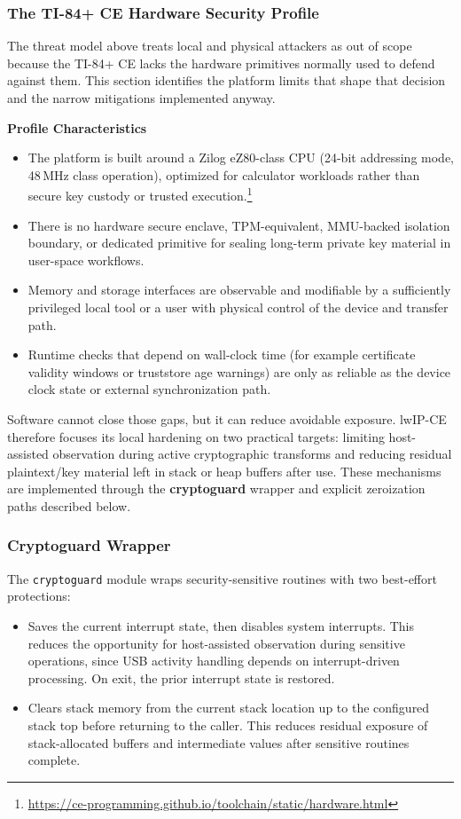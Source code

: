 \documentclass[titlepage]{report}
\begin{document}
	\subsubsection{The TI-84+ CE Hardware Security Profile}
	The threat model above treats local and physical attackers as out of scope because the TI-84+ CE lacks the hardware primitives normally used to defend against them. This section identifies the platform limits that shape that decision and the narrow mitigations implemented anyway.
	
	\textbf{Profile Characteristics}
	\begin{itemize}
		\item The platform is built around a Zilog eZ80-class CPU (24-bit addressing mode, 48\,MHz class operation), optimized for calculator workloads rather than secure key custody or trusted execution.\footnote{\url{https://ce-programming.github.io/toolchain/static/hardware.html}}
		\item There is no hardware secure enclave, TPM-equivalent, MMU-backed isolation boundary, or dedicated primitive for sealing long-term private key material in user-space workflows.
		\item Memory and storage interfaces are observable and modifiable by a sufficiently privileged local tool or a user with physical control of the device and transfer path.
		\item Runtime checks that depend on wall-clock time (for example certificate validity windows or truststore age warnings) are only as reliable as the device clock state or external synchronization path.
	\end{itemize}
	
	Software cannot close those gaps, but it can reduce avoidable exposure. lwIP-CE therefore focuses its local hardening on two practical targets: limiting host-assisted observation during active cryptographic transforms and reducing residual plaintext/key material left in stack or heap buffers after use. These mechanisms are implemented through the \textbf{cryptoguard} wrapper and explicit zeroization paths described below.
	
	\subsubsection{Cryptoguard Wrapper}
	The \texttt{cryptoguard} module wraps security-sensitive routines with two best-effort protections:
	\begin{itemize}
		\item Saves the current interrupt state, then disables system interrupts. This reduces the opportunity for host-assisted observation during sensitive operations, since USB activity handling depends on interrupt-driven processing. On exit, the prior interrupt state is restored.
		\item Clears stack memory from the current stack location up to the configured stack top before returning to the caller. This reduces residual exposure of stack-allocated buffers and intermediate values after sensitive routines complete.
	\end{itemize}
	
\end{document}
